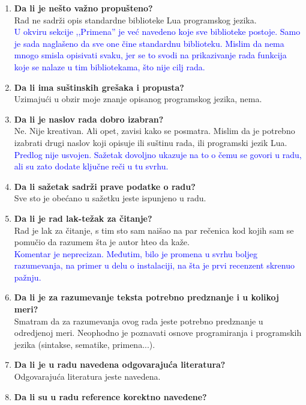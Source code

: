 \documentclass[a4paper]{report}
\newcommand{\odgovorAutora}[1]{\textcolor{blue}{#1}}
\begin{document}
\begin{enumerate}
\item \textbf {Da li je nešto važno propušteno?}\\
  Rad ne sadr\v zi opis standardne biblioteke Lua programskog jezika. \\ 
  \odgovorAutora{U okviru sekcije ,,Primena'' je već navedeno koje sve biblioteke postoje. Samo je sada naglašeno da sve one čine standardnu biblioteku. Mislim da nema mnogo smisla opisivati svaku, jer se to svodi na prikazivanje rada funkcija koje se nalaze u tim bibliotekama, što nije cilj rada.}
\item \textbf {Da li ima suštinskih grešaka i propusta?}\\
  Uzimaju\' ci u obzir moje znanje opisanog programskog jezika, nema.
\item \textbf {Da li je naslov rada dobro izabran?}\\
  Ne. Nije kreativan. Ali opet, zavisi kako se posmatra. Mislim da je potrebno izabrati drugi naslov koji opisuje ili su\v stinu rada, ili programski jezik Lua. \\ \odgovorAutora{Predlog nije usvojen. Sažetak dovoljno ukazuje na to o čemu se govori u radu, ali su zato dodate ključne reči u tu svrhu.}
\item \textbf {Da li sažetak sadrži prave podatke o radu?}\\
  Sve sto je obe\' cano u sa\v zetku jeste ispunjeno u radu.
\item \textbf {Da li je rad lak-težak za čitanje?}\\
  Rad je lak za \v citanje, s tim sto sam nai\v sao na par re\v cenica kod kojih sam se pomu\v cio da razumem \v sta je autor hteo da ka\v ze. \\ \odgovorAutora{Komentar je neprecizan. Međutim, bilo je promena u svrhu boljeg razumevanja, na primer u delu o instalaciji, na šta je prvi recenzent skrenuo pažnju.}
\item \textbf {Da li je za razumevanje teksta potrebno predznanje i u kolikoj meri?}\\
  Smatram da za razumevanja ovog rada jeste potrebno predznanje u odredjenoj meri. Neophodno je poznavati osnove programiranja i programskih jezika (sintakse, sematike, primena...).
\item \textbf {Da li je u radu navedena odgovarajuća literatura?}\\
  Odgovaraju\' ca literatura jeste navedena.
\item \textbf {Da li su u radu reference korektno navedene?}\\

\end{enumerate}
\end{document}
